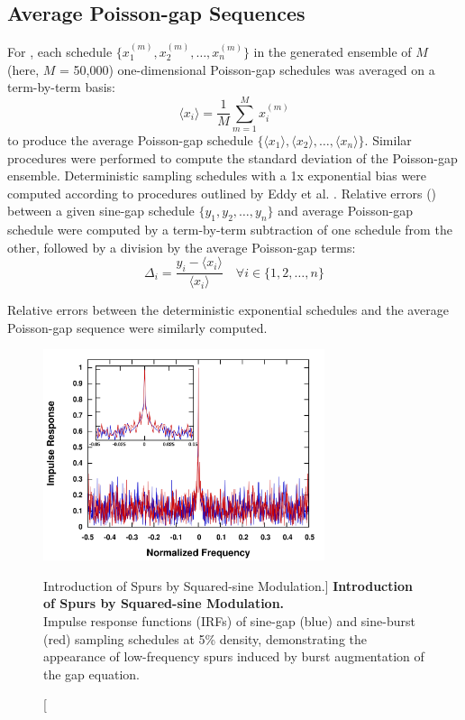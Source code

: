 \subsection{Average Poisson-gap Sequences}

\begin{doublespace}
For , each schedule
$\{x_1^{(m)}, x_2^{(m)},\dots, x_n^{(m)}\}$ in
the generated ensemble of $M$ (here, $M$ = 50,000)
one-dimensional Poisson-gap schedules was averaged
on a term-by-term basis:
\begin{equation}
\langle x_i \rangle = \frac{1}{M} \sum_{m=1}^M x_i^{(m)}
\end{equation}
to produce the average Poisson-gap schedule
$\{\langle x_1 \rangle, \langle x_2 \rangle,\dots, \langle x_n \rangle\}$.
Similar procedures were performed to compute the standard deviation of the
Poisson-gap ensemble. Deterministic sampling schedules with a 1x exponential
bias were computed according to procedures outlined by
Eddy et al. \cite{eddy:jmr2012}. Relative errors
() between a given
sine-gap schedule $\{y_1, y_2,\dots, y_n\}$ and average Poisson-gap schedule
were computed by a term-by-term subtraction of one schedule from the other,
followed by a division by the average Poisson-gap terms:
\begin{equation}
\Delta_i = \frac{y_i - \langle x_i \rangle}{\langle x_i \rangle}
 \quad \forall i \in \{1,2,\dots, n\}
\end{equation}

Relative errors between the deterministic exponential schedules and the
average Poisson-gap sequence were similarly computed.
\end{doublespace}

\begin{figure}
\includegraphics[width=3.25in]{figs/dgs/11-spurs.png}
\caption
      [Introduction of Spurs by Squared-sine Modulation.]{
  {\bf Introduction of Spurs by Squared-sine Modulation.}
  \\
  Impulse response functions (IRFs) of sine-gap (blue) and sine-burst (red)
  sampling schedules at 5\% density, demonstrating the appearance of
  low-frequency spurs induced by burst augmentation of the gap equation.
}
\label{figure.2.11}
\end{figure}

